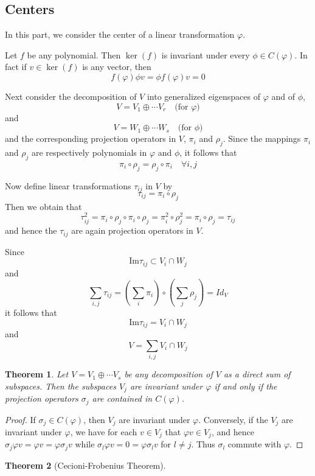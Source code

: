\documentclass{book}
\newtheorem{theorem}{Theorem}[section]
\theoremstyle{definition}
\begin{document}
\subsection{Centers}
In this part, we consider the center of a linear transformation $\varphi$.\par
Let $f$ be any polynomial. Then $\ker(f)$ is invariant under every $\phi\in C(\varphi)$. In fact if $v\in \ker(f)$ is any vector, then 
\[f(\varphi)\phi v=\phi f(\varphi)v=0\]\par
Next consider the decomposition of $V$ into generalized eigenspaces of $\varphi$ and of $\phi$, 
\[V=V_1\oplus\cdots V_r\quad \text{(for }\varphi\text{)}\]
and
\[V=W_1\oplus\cdots W_s\quad \text{(for }\phi\text{)}\]
and the corresponding projection operators in $V$, $\pi_i$ and $\rho_j$. Since the mappings $\pi_i$ and $\rho_j$ are respectively polynomials in $\varphi$ and $\phi$, it follows that 
\[\pi_i\circ \rho_j=\rho_j\circ\pi_i\quad \forall i,j\]\par
Now define linear transformations $\tau_{ij}$ in $V$ by \[\tau_{ij}=\pi_i\circ\rho_j\]
Then we obtain that \[\tau_{ij}^2=\pi_i\circ \rho_j\circ\pi_i\circ \rho_j=\pi_i^2\circ\rho_j^2=\pi_i\circ\rho_j=\tau_{ij}\]
and hence the $\tau_{ij}$ are again projection operators in $V$.\par
Since \[\text{Im} \tau_{ij}\subset V_i\cap W_j\]
and \[\sum_{i,j}\tau_{ij}=(\sum_i \pi_i)\circ(\sum_j\rho_j)=Id_V\]
it follows that \[ \text{Im}\tau_{ij}=V_i\cap W_j\]
and \[V=\sum_{i,j} V_i\cap W_j\]
\begin{theorem}
Let $V=V_1\oplus\cdots V_s$ be any decomposition of $V$ as a direct sum of subspaces. Then the subspaces $V_j$ are invariant under $\varphi$ if and only if the projection operators $\sigma_j$ are contained in $C(\varphi)$.
\end{theorem}
\begin{proof}
If $\sigma_j\in C(\varphi)$, then $V_j$ are invariant under $\varphi$. Conversely, if the $V_j$ are invariant under $\varphi$, we have for each $v\in V_j$ that $\varphi v\in V_j$, and hence $\sigma_j \varphi v=\varphi v=\varphi \sigma_j v$ while $\sigma_l\varphi v=0=\varphi \sigma_l v$ for $l\ne j$. Thus $\sigma_l$ commute with $\varphi$.
\end{proof}
\begin{theorem}[Cecioni-Frobenius Theorem]

\end{theorem}
\end{document}
